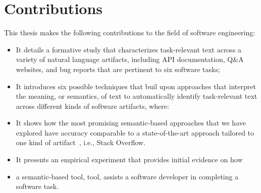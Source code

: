

\section{Contributions}
\label{cp1:contributions}

This thesis makes the following contributions to the field of software engineering:




\begin{itemize}

    \item It details a formative study that characterizes task-relevant text across a variety of natural language artifacts, including  API documentation, Q\&A websites, and
    bug reports that are pertinent to six software tasks; 

    \item It introduces six possible techniques that buil upon approaches that interpret the meaning, or semantics, of text
    to automatically identify task-relevant text across different kinds of software artifacts, where:


    \item It shows how the most promising semantic-based approaches that we have explored have accuracy comparable to a state-of-the-art approach
    tailored to one kind of artifact~\cite{Xu2017}, i.e., Stack Overflow.

    \item It presents an empirical experiment that provides initial evidence on how  
    \item a semantic-based tool, \acs{tool}, assists a software developer in completing a software task. 
\end{itemize}












